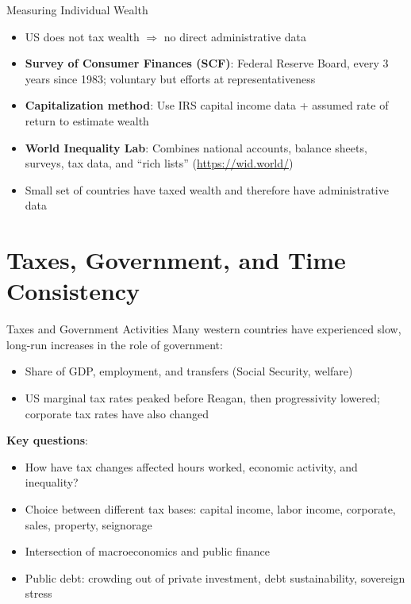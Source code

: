 \documentclass[blue]{beamer}
\begin{document}
\begin{frame}{Measuring Individual Wealth}
	\begin{itemize}
		\item US does not tax wealth $\Rightarrow$ no direct administrative data
		\item \textbf{Survey of Consumer Finances (SCF)}: Federal Reserve Board, every 3 years since 1983; voluntary but efforts at representativeness
		\item \textbf{Capitalization method}: Use IRS capital income data + assumed rate of return to estimate wealth
		\item \textbf{World Inequality Lab}: Combines national accounts, balance sheets, surveys, tax data, and ``rich lists'' (\url{https://wid.world/})
		\item Small set of countries have taxed wealth and therefore have administrative data
	\end{itemize}
\end{frame}


\section{Taxes, Government, and Time Consistency}

\begin{frame}{Taxes and Government Activities}
	Many western countries have experienced slow, long-run increases in the role of government:
			\vspace{-6pt}
	\begin{itemize}
		\item Share of GDP, employment, and transfers (Social Security, welfare)
		\item US marginal tax rates peaked before Reagan, then progressivity lowered; corporate tax rates have also changed
	\end{itemize}
	

	\textbf{Key questions}:
			\vspace{-6pt}
	\begin{itemize}
		\item How have tax changes affected hours worked, economic activity, and inequality?
		\item Choice between different tax bases: capital income, labor income, corporate, sales, property, seignorage
		\item Intersection of macroeconomics and public finance
		\item Public debt: crowding out of private investment, debt sustainability, sovereign stress
	\end{itemize}
\end{frame}
\end{document}
